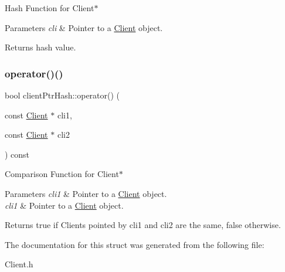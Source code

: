 Hash Function for Client$\ast$ 
\begin{DoxyParams}{Parameters}
{\em cli} & Pointer to a \hyperlink{class_client}{Client} object. \\
\hline
\end{DoxyParams}
\begin{DoxyReturn}{Returns}
hash value. 
\end{DoxyReturn}
\hypertarget{structclient_ptr_hash_adb7164b667757ee8091c7b7337b1be2b}{}\label{structclient_ptr_hash_adb7164b667757ee8091c7b7337b1be2b} 
\subsubsection{\texorpdfstring{operator()()}{operator()()}\hspace{0.1cm}{\footnotesize\ttfamily [2/2]}}
{\footnotesize\ttfamily bool client\+Ptr\+Hash\+::operator() (\begin{DoxyParamCaption}\item[{const \hyperlink{class_client}{Client} $\ast$}]{cli1,  }\item[{const \hyperlink{class_client}{Client} $\ast$}]{cli2 }\end{DoxyParamCaption}) const\hspace{0.3cm}{\ttfamily [inline]}}

Comparison Function for Client$\ast$ 
\begin{DoxyParams}{Parameters}
{\em cli1} & Pointer to a \hyperlink{class_client}{Client} object. \\
\hline
{\em cli1} & Pointer to a \hyperlink{class_client}{Client} object. \\
\hline
\end{DoxyParams}
\begin{DoxyReturn}{Returns}
true if Clients pointed by cli1 and cli2 are the same, false otherwise. 
\end{DoxyReturn}


The documentation for this struct was generated from the following file\+:\begin{DoxyCompactItemize}
\item 
Client.\+h\end{DoxyCompactItemize}
